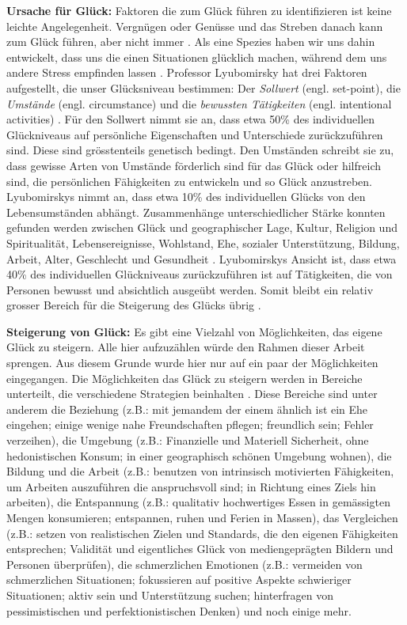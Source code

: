 \par
\textbf{Ursache für Glück:}
Faktoren die zum Glück führen zu identifizieren ist keine leichte Angelegenheit. Vergnügen oder Genüsse und das Streben danach kann zum Glück führen, aber nicht immer \cite{Diener2009, Eid2008}. Als eine Spezies haben wir uns dahin entwickelt, dass uns die einen Situationen glücklich machen, während dem uns andere Stress empfinden lassen \cite{Carr2011}. Professor Lyubomirsky hat drei Faktoren aufgestellt, die unser Glücksniveau bestimmen: Der \textit{Sollwert} (engl. set-point), die \textit{Umstände} (engl. circumstance) und die \textit{bewussten Tätigkeiten} (engl. intentional activities) \cite{Lyubomirsky2008, Lyubomirsky2005}. Für den Sollwert nimmt sie an, dass etwa 50\% des individuellen Glückniveaus auf persönliche Eigenschaften und Unterschiede zurückzuführen sind. Diese sind grösstenteils genetisch bedingt. Den Umständen schreibt sie zu, dass gewisse Arten von Umstände förderlich sind für das Glück oder hilfreich sind, die persönlichen Fähigkeiten zu entwickeln und so Glück anzustreben. Lyubomirskys nimmt an, dass etwa 10\% des individuellen Glücks von den Lebensumständen abhängt. Zusammenhänge unterschiedlicher Stärke konnten gefunden werden zwischen Glück und geographischer Lage, Kultur, Religion und Spiritualität, Lebensereignisse, Wohlstand, Ehe, sozialer Unterstützung, Bildung, Arbeit, Alter, Geschlecht und Gesundheit \cite{Carr2011}. Lyubomirskys Ansicht ist, dass etwa 40\% des individuellen Glückniveaus zurückzuführen ist auf Tätigkeiten, die von Personen bewusst und absichtlich ausgeübt werden. Somit bleibt ein relativ grosser Bereich für die Steigerung des Glücks übrig \cite{Lyubomirsky2008}.
\par
\textbf{Steigerung von Glück:} Es gibt eine Vielzahl von Möglichkeiten, das eigene Glück zu steigern. Alle hier aufzuzählen würde den Rahmen dieser Arbeit sprengen. Aus diesem Grunde wurde hier nur auf ein paar der Möglichkeiten eingegangen. Die Möglichkeiten das Glück zu steigern werden in Bereiche unterteilt, die verschiedene Strategien beinhalten \cite{Carr2011}. Diese Bereiche sind unter anderem die Beziehung (z.B.: mit jemandem der einem ähnlich ist ein Ehe eingehen; einige wenige nahe Freundschaften pflegen; freundlich sein; Fehler verzeihen), die Umgebung (z.B.: Finanzielle und Materiell Sicherheit, ohne hedonistischen Konsum; in einer geographisch schönen Umgebung wohnen), die Bildung und die Arbeit (z.B.: benutzen von intrinsisch motivierten Fähigkeiten, um Arbeiten auszuführen die anspruchsvoll sind; in Richtung eines Ziels hin arbeiten), die Entspannung (z.B.: qualitativ hochwertiges Essen in gemässigten Mengen konsumieren; entspannen, ruhen und Ferien in Massen), das Vergleichen (z.B.: setzen von realistischen Zielen und Standards, die den eigenen Fähigkeiten entsprechen; Validität und eigentliches Glück von mediengeprägten Bildern und Personen überprüfen), die schmerzlichen Emotionen (z.B.: vermeiden von schmerzlichen Situationen; fokussieren auf positive Aspekte schwieriger Situationen; aktiv sein und Unterstützung suchen; hinterfragen von pessimistischen und perfektionistischen Denken) und noch einige mehr.
